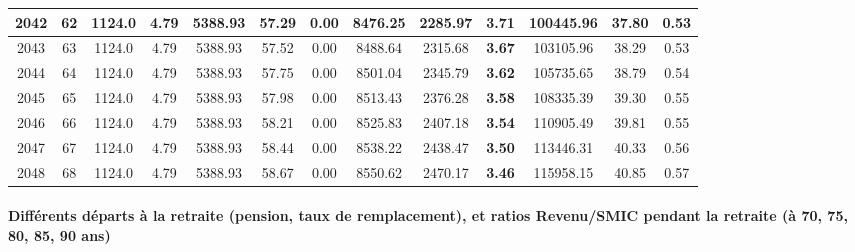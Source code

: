 {\begin{center}
\begin{tabular}[htb]{|c|c||c|c|c|c|c|c||c|c||c|c|c||}
\hline 
 2042 &  62 &  1124.0 &  4.79 &  5388.93 &  57.29 &  0.00 &  8476.25 &  2285.97 &  {\bf 3.71} &  100445.96 &  37.80 &  0.53 \\ 
\hline 
 2043 &  63 &  1124.0 &  4.79 &  5388.93 &  57.52 &  0.00 &  8488.64 &  2315.68 &  {\bf 3.67} &  103105.96 &  38.29 &  0.53 \\ 
\hline 
 2044 &  64 &  1124.0 &  4.79 &  5388.93 &  57.75 &  0.00 &  8501.04 &  2345.79 &  {\bf 3.62} &  105735.65 &  38.79 &  0.54 \\ 
\hline 
 2045 &  65 &  1124.0 &  4.79 &  5388.93 &  57.98 &  0.00 &  8513.43 &  2376.28 &  {\bf 3.58} &  108335.39 &  39.30 &  0.55 \\ 
\hline 
 2046 &  66 &  1124.0 &  4.79 &  5388.93 &  58.21 &  0.00 &  8525.83 &  2407.18 &  {\bf 3.54} &  110905.49 &  39.81 &  0.55 \\ 
\hline 
 2047 &  67 &  1124.0 &  4.79 &  5388.93 &  58.44 &  0.00 &  8538.22 &  2438.47 &  {\bf 3.50} &  113446.31 &  40.33 &  0.56 \\ 
\hline 
 2048 &  68 &  1124.0 &  4.79 &  5388.93 &  58.67 &  0.00 &  8550.62 &  2470.17 &  {\bf 3.46} &  115958.15 &  40.85 &  0.57 \\ 
\hline 
\hline 
\end{tabular} 
\end{center} } 
\newpage 
 
\paragraph{Différents départs à la retraite (pension, taux de remplacement), et ratios Revenu/SMIC pendant la retraite (à 70, 75, 80, 85, 90 ans)} 

